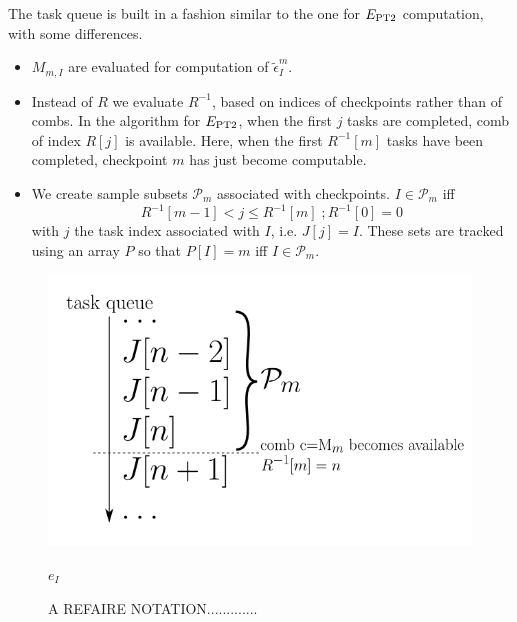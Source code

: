 \documentclass[./thesis.tex]{subfiles}
\begin{document}
The task queue is built in a fashion similar to the one for $E_\text{PT2}$ computation, with some differences.
\begin{itemize}
\item
$M_{m,I}$ are evaluated for computation of $\tilde \epsilon^m_I$.
\item
Instead of $R$ we evaluate $R^{-1}$, based on indices of checkpoints rather than of combs. In the algorithm for $E_\text{PT2}$, when the first $j$ tasks are completed, comb of index $R[j]$ is available. Here, when the first $R^{-1}[m]$ tasks have been completed, checkpoint $m$ has just become computable.
\item
We create sample subsets $\mathcal{P}_m$ associated with checkpoints. $I \in \mathcal{P}_m$ iff
\begin{equation}
R^{-1}[m-1] < j \leq R^{-1}[m]  \;; R^{-1}[0] = 0
\end{equation}
with $j$ the task index associated with $I$, i.e. $J[j]=I$. These sets are tracked using an array $P$ so that $P[I]=m$ iff $I \in \mathcal{P}_m$.

\end{itemize}

\begin{figure}[h!]
	\begin{center}
		\includegraphics[width=0.7\columnwidth]{figures/matrix_dressing/taskqueue}
		\caption{A REFAIRE NOTATION.............}
		\label{fig:eici2}
		$e_I$
	\end{center}
\end{figure}
\end{document}

